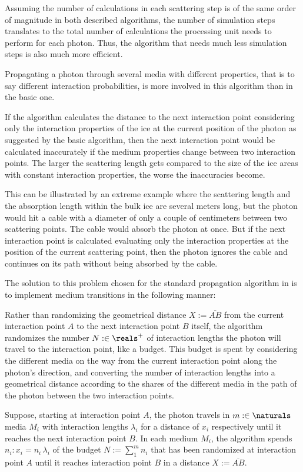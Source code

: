Assuming the number of calculations in each scattering step is of the same order of magnitude in both described algorithms, the number of simulation steps translates to the total number of calculations the processing unit needs to perform for each photon. Thus, the algorithm that needs much less simulation steps is also much more efficient.

Propagating a photon through several media with different properties, that is to say different interaction probabilities, is more involved in this algorithm than in the basic one.

If the algorithm calculates the distance to the next interaction point considering only the interaction properties of the ice at the current position of the photon as suggested by the basic algorithm, then the next interaction point would be calculated inaccurately if the medium properties change between two interaction points. The larger the scattering length gets compared to the size of the ice areas with constant interaction properties, the worse the inaccuracies become.

This can be illustrated by an extreme example where the scattering length and the absorption length within the bulk ice are several meters long, but the photon would hit a cable with a diameter of only a couple of centimeters between two scattering points. The cable would absorb the photon at once. But if the next interaction point is calculated evaluating only the interaction properties at the position of the current scattering point, then the photon ignores the cable and continues on its path without being absorbed by the cable.

The solution to this problem chosen for the standard propagation algorithm in \icecube is to implement medium transitions in the following manner:

Rather than randomizing the geometrical distance $X:=\overline{AB}$ from the current interaction point $A$ to the next interaction point $B$ itself, the algorithm randomizes the number $N :\in \reals^+$ of interaction lengths the photon will travel to the interaction point, like a budget. This budget is spent by considering the different media on the way from the current interaction point along the photon's direction, and converting the number of interaction lengths into a geometrical distance according to the shares of the different media in the path of the photon between the two interaction points.

Suppose, starting at interaction point $A$, the photon travels in $m :\in \naturals$ media $M_i$ with interaction lengths $\lambda_i$ for a distance of $x_i$ respectively until it reaches the next interaction point $B$. In each medium $M_i$, the algorithm spends $n_i: x_i = n_i\,\lambda_i$ of the budget $N:=\sum_1^m n_i$ that has been randomized at interaction point $A$ until it reaches interaction point $B$ in a distance $X:=\overline{AB}$.

